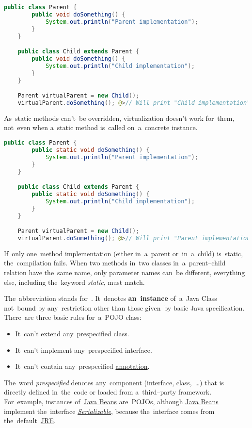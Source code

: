 \begin{lstlisting}[language=Java]
    public class Parent {
        public void doSomething() {
            System.out.println("Parent implementation");
        }
    }

    public class Child extends Parent {
        public void doSomething() {
            System.out.println("Child implementation");
        }
    }

    Parent virtualParent = new Child();
    virtualParent.doSomething(); @>// Will print "Child implementation"
\end{lstlisting}

\warning As~static methods can't~be overridden, virtualization doesn't work for~them, not~even when a~static method is~called on~a~concrete instance.

\example
\begin{lstlisting}[language=Java]
    public class Parent {
        public static void doSomething() {
            System.out.println("Parent implementation");
        }
    }

    public class Child extends Parent {
        public static void doSomething() {
            System.out.println("Child implementation");
        }
    }

    Parent virtualParent = new Child();
    virtualParent.doSomething(); @>// Will print "Parent implementation"
\end{lstlisting}

\note If~only one~method implementation (either in~a~parent or~in~a~child) is~static, the~compilation fails.
When two methods in~two classes in~a~parent--child relation have the~same name, only parameter names can~be different, everything else, including the~keyword \textit{static}, must match.

\label{pojo}
The~abbreviation stands for~.
It~denotes \textbf{an~instance} of~a~Java Class not~bound by any~restriction other than those given~by basic Java specification.
There~are three basic rules for~a~POJO class:
\begin{itemize}
    \item It~can't extend any~prespecified class.
    \item It~can't implement any~prespecified interface.
    \item It~can't contain any~prespecified \hyperref[javaannotation]{annotation}.
\end{itemize}
\noindent The~word \textit{prespecified} denotes any~component (interface, class,~\dots) that is directly defined in~the~code or loaded from a~third--party framework.
For~example, instances of~\hyperref[javabeans]{Java Beans} are~POJOs, although \hyperref[javabeans]{Java Beans} implement the~interface \hyperref[serialization]{\textit{Serializable}}, because the~interface comes from the~default~\hyperref[jdkjrejvm]{JRE}.

